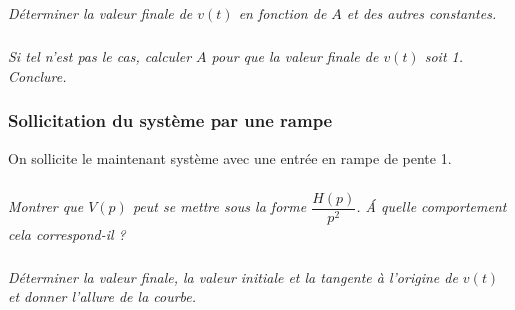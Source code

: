 \documentclass[10pt]{article}
\newif\ifprof
\begin{document}
\subparagraph{}
\textit{Déterminer la valeur finale de $v(t)$ en fonction de $A$ et des autres constantes. }
\ifprof
\begin{corrige}
D'après le théorème de la valeur finale, on a : 
$$
\lim\limits_{t\to +\infty} v(t)= 
\lim\limits_{p\to 0} p\cdot V(p)= 
\dfrac{BCDEF}{1+BCD\mu}
$$
\end{corrige}
\else
\fi



\subparagraph{}
\textit{Si tel n’est pas le cas, calculer $A$ pour que la valeur finale de $v(t)$ soit 1. Conclure.}
\ifprof
\begin{corrige}
$$
\dfrac{BCDEF}{1+BCD\mu} = 1 
\Longleftrightarrow BCDEF = 1+BCD\mu
\Longleftrightarrow C\left(BDEF - BD\mu \right) = 1
\Longleftrightarrow C= \dfrac{1}{BDEF - BD\mu}$$

Une valeur finale de 1 permet de satisfaire l'exigence d'avoir un écart statique nul sans perturbation. Il faudrait ensuite vérifier l'écart statique lorsqu'il y a une perturbation pour pouvoir vérifier l'exigence 1.2.1.3.


\end{corrige}
\else
\fi

\subsubsection{Sollicitation du système par une rampe}
\vspace{.25cm}
On sollicite le maintenant système avec une entrée en rampe de pente 1. 

\subparagraph{}
\textit{Montrer que $V(p)$ peut se mettre sous la forme $\dfrac{H(p)}{p^2}$. \'A quelle comportement cela correspond-il ?}
\ifprof
\begin{corrige}
La fonction de transfert d'une rampe de pente 1 est égale à $V_c(p)=\dfrac{1}{p^2}$.
On a donc $V(p)=\dfrac{H(p)}{p^2}$.

La sollicitation en rampe correspond ici à l'accélération de la cabine pour aller d'une vitesse nulle à une vitesse définie au préalable.
\end{corrige}
\else
\fi



\subparagraph{}
\textit{Déterminer la valeur finale, la valeur initiale et la tangente à l’origine de $v(t)$ et donner l'allure de la courbe.}
\ifprof
\begin{corrige}
$$V(p) = \dfrac{1}{p^2} \cdot \dfrac{\dfrac{BCDEF}{1+BCD\mu}}{1+\dfrac{T}{1+BCD\mu} p}$$
\begin{itemize}
\item Valeur finale : $\lim\limits_{t\to +\infty} v(t)=  \lim\limits_{p\to 0} pV(p)=+\infty$  
\item Valeur initiale : $\lim\limits_{t\to 0} v(t)=  \lim\limits_{p\to +\infty} pV(p)=0$
\item Valeur de la pente à l'origine :  $\lim\limits_{t\to 0} \dot{v}(t)=  \lim\limits_{p\to +\infty} p^2V(p)=0$
\end{itemize}
\end{corrige}
\else
\fi
\end{document}
